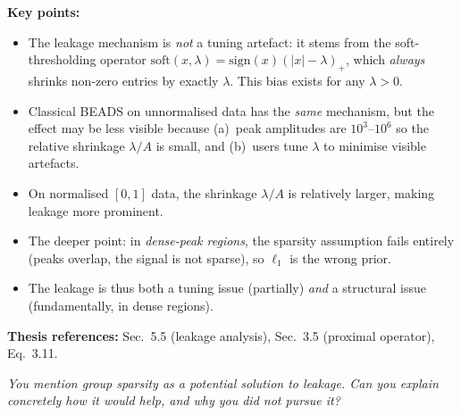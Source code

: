 \documentclass[11pt, letterpaper]{article}
\newcounter{qcounter}
\newcommand{\question}[1]{%
  \stepcounter{qcounter}%
  \begin{questionbox}[Q\theqcounter]%
    \itshape #1%
  \end{questionbox}%
}
\begin{document}
\begin{answerbox}
\textbf{Key points:}
\begin{itemize}[nosep]
  \item The leakage mechanism is \emph{not} a tuning artefact:
        it stems from the soft-thresholding operator
        $\text{soft}(x, \lambda) = \text{sign}(x)(|x| - \lambda)_+$,
        which \emph{always} shrinks non-zero entries by exactly
        $\lambda$.  This bias exists for any $\lambda > 0$.
  \item Classical BEADS on unnormalised data has the \emph{same}
        mechanism, but the effect may be less visible because
        (a)~peak amplitudes are $10^3$--$10^6$ so the relative
        shrinkage $\lambda / A$ is small, and (b)~users tune
        $\lambda$ to minimise visible artefacts.
  \item On normalised $[0,1]$ data, the shrinkage $\lambda / A$
        is relatively larger, making leakage more prominent.
  \item The deeper point: in \emph{dense-peak regions}, the
        sparsity assumption fails entirely (peaks overlap, the
        signal is not sparse), so $\ell_1$ is the wrong prior.
  \item The leakage is thus both a tuning issue (partially)
        \emph{and} a structural issue (fundamentally, in dense regions).
\end{itemize}
\textbf{Thesis references:} Sec.~5.5 (leakage analysis), Sec.~3.5 (proximal operator), Eq.~3.11.
\end{answerbox}

\question{You mention group sparsity as a potential solution to leakage.
Can you explain concretely how it would help, and why you did not
pursue it?}
\end{document}
